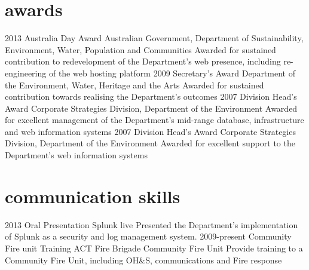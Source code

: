 \documentclass[]{friggeri-cv} %
\begin{document}
\section{awards}
\begin{entrylist}
\entry
{2013}
{Australia Day Award}
{Australian Government, Department of Sustainability, Environment, Water, Population and Communities}
{Awarded for sustained contribution to redevelopment of the Department's web presence, including re-engineering of the web hosting platform}
\entry
{2009}
{Secretary's Award}
{Department of the Environment, Water, Heritage and the Arts}
{Awarded for sustained contribution towards realising the Department's outcomes}
\entry
{2007}
{Division Head's Award}
{Corporate Strategies Division, Department of the Environment}
{Awarded for excellent management of the Department's mid-range database, infrastructure and web information systems}
\entry
{2007}
{Division Head's Award}
{Corporate Strategies Division, Department of the Environment}
{Awarded for excellent support to the Department's web information systems}
\end{entrylist}


\section{communication skills}

\begin{entrylist}
\entry
{2013}
{Oral Presentation}
{Splunk live}
{Presented the Department's implementation of Splunk as a security and log management system.}
\entry
{2009-present}
{Community Fire unit Training}
{ACT Fire Brigade Community Fire Unit}
{Provide training to a Community Fire Unit, including OH\&S, communications and Fire response}
\end{entrylist}

\end{document}

